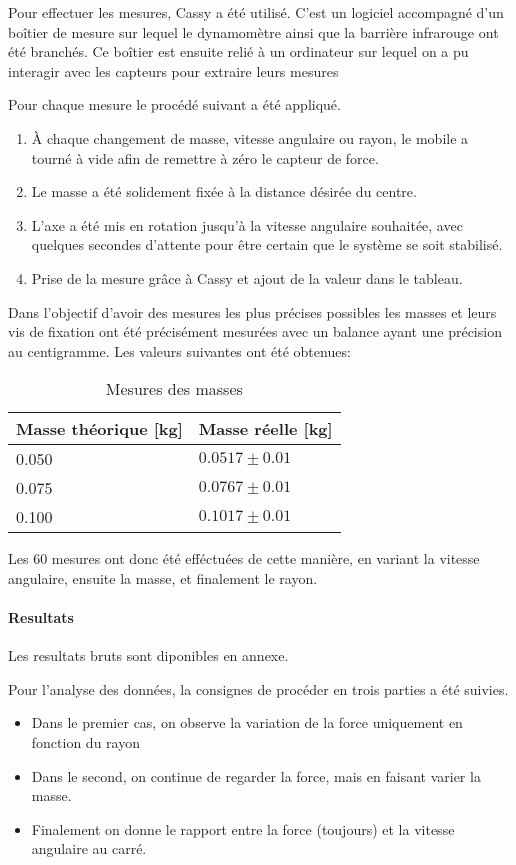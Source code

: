 Pour effectuer les mesures, Cassy a été utilisé. C'est un logiciel accompagné d'un boîtier de mesure sur lequel le dynamomètre ainsi que la barrière infrarouge ont été branchés.
Ce boîtier est ensuite relié à un ordinateur sur lequel on a pu interagir avec les capteurs pour extraire leurs mesures

Pour chaque mesure le procédé suivant a été appliqué.
\begin{enumerate}
    \item À chaque changement de masse, vitesse angulaire ou rayon, le mobile a tourné à vide afin de remettre à zéro le capteur de force.
    \item Le masse a été solidement fixée à la distance désirée du centre.
    \item L'axe a été mis en rotation jusqu'à la vitesse angulaire souhaitée, avec quelques secondes d'attente pour être certain que le système se soit stabilisé.
    \item Prise de la mesure grâce à Cassy et ajout de la valeur dans le tableau.
\end{enumerate}

Dans l'objectif d'avoir des mesures les plus précises possibles les masses et leurs vis de fixation ont été précisément mesurées avec un balance ayant une précision au centigramme. Les valeurs suivantes ont été obtenues:
\begin{table}[ht]
    \caption[Mesure des masses]{Mesures des masses}
    \centering
    \begin{tabular}{|l|l|}
	\hline
	Masse théorique [kg] & Masse réelle [kg]\\
	\hline
	0.050 & $0.0517 \pm 0.01$\\
	0.075 & $0.0767 \pm 0.01$\\
	0.100 & $0.1017 \pm 0.01$\\
	\hline
    \end{tabular}
\end{table}

Les 60 mesures ont donc été efféctuées de cette manière, en variant la vitesse angulaire, ensuite la masse, et finalement le rayon. 

\paragraph{Resultats}
Les resultats bruts sont diponibles en annexe.

Pour l'analyse des données, la consignes de procéder en trois parties a été suivies.
\begin{itemize}
    \item Dans le premier cas, on observe la variation de la force uniquement en fonction du rayon
    \item Dans le second, on continue de regarder la force, mais en faisant varier la masse.
    \item Finalement on donne le rapport entre la force (toujours) et la vitesse angulaire au carré.
\end{itemize}


